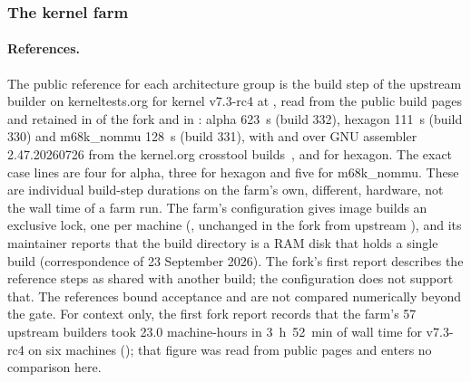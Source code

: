 \subsubsection{The kernel farm}
\label{sec:eval:rq5:kernel}

\paragraph{References.}
The public reference for each architecture group is the build step of the
upstream builder on kerneltests.org for kernel v7.3-rc4 at
, read from the public build
pages and retained in  of
the fork and in
:
alpha 623~s (build 332),
hexagon 111~s (build 330) and m68k\_nommu 128~s (build 331), with
 and 
over GNU assembler 2.47.20260726 from the kernel.org crosstool
builds~\cite{crosstool}, and  for
hexagon. The exact case lines are four for alpha, three for hexagon and five
for m68k\_nommu. These are individual build-step durations on the farm's
own, different, hardware, not the wall time of a farm run. The farm's
configuration gives image builds an exclusive lock, one per machine
(, unchanged in the fork from upstream
), and its maintainer reports that the build directory is a RAM
disk that holds a single build (correspondence of 23 September 2026). The
fork's first report describes the reference steps as shared with another
build; the configuration does not support that. The references bound
acceptance and are not compared numerically beyond the gate. For context only, the first fork report
records that the farm's 57 upstream builders took 23.0 machine-hours in
3~h~52~min of wall time for v7.3-rc4 on six machines
(); that figure was read from public pages and
enters no comparison here.

